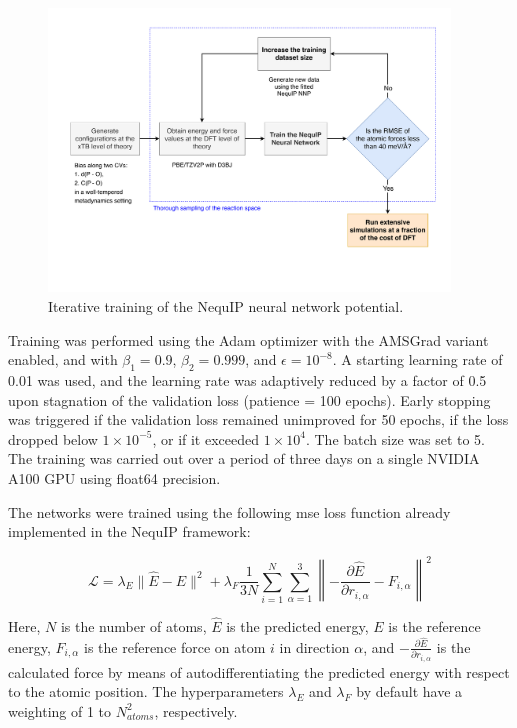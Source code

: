 \begin{figure}[t!]
    \centering
    \includegraphics[width=0.95\textwidth]{Figures/3_Computational_details/methods_workflow_diagram.pdf}
    \caption{Iterative training of the NequIP neural network potential.}
    \label{fig:iterative-training}
\end{figure}

Training was performed using the Adam optimizer with the AMSGrad variant enabled, and with $\beta_1 = 0.9$, $\beta_2 = 0.999$, and $\epsilon = 10^{-8}$. A starting learning rate of 0.01 was used, and the learning rate was adaptively reduced by a factor of 0.5 upon stagnation of the validation loss (patience = 100 epochs). Early stopping was triggered if the validation loss remained unimproved for 50 epochs, if the loss dropped below $1 \times 10^{-5}$, or if it exceeded $1 \times 10^{4}$. The batch size was set to 5. The training was carried out over a period of three days on a single NVIDIA A100 GPU using float64 precision.

The networks were trained using the following \ac{mse} loss function already implemented in the NequIP framework:

\begin{equation}
    \mathcal{L} = \lambda_E \lVert \hat{E} - E \rVert^2 
    + \lambda_F \frac{1}{3N} \sum_{i=1}^{N} \sum_{\alpha=1}^{3} 
    \left\lVert -\frac{\partial \hat{E}}{\partial r_{i,\alpha}} - F_{i,\alpha} \right\rVert^2
    \label{eq:loss_function}
\end{equation}

Here, $N$ is the number of atoms, $\hat{E}$ is the predicted energy, $E$ is the reference energy, $F_{i,\alpha}$ is the reference force on atom $i$ in direction $\alpha$, and $-\frac{\partial \hat{E}}{\partial r_{i,\alpha}}$ is the calculated force by means of autodifferentiating the predicted energy with respect to the atomic position. The hyperparameters $\lambda_E$ and $\lambda_F$ by default have a weighting of 1 to $N_{atoms}^2$, respectively.

